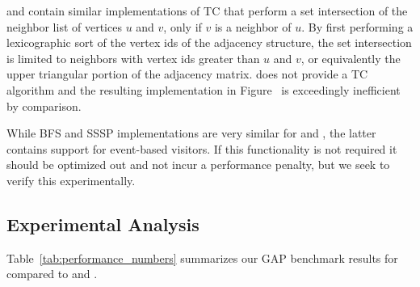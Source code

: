 \nwgraph and \stdgraph contain similar implementations of TC 
that perform a set intersection of the neighbor list of vertices
$u$ and $v$, only if $v$ is a neighbor of $u$.
By first performing a lexicographic sort of the vertex ids of the adjacency
structure, the set intersection is limited to neighbors with vertex ids greater
than $u$ and $v$, or equivalently the upper triangular portion of the adjacency
matrix.  \bgl does not provide a TC algorithm and the resulting implementation in Figure~\cite{}
is exceedingly inefficient by comparison.

While BFS and SSSP implementations are very similar for \nwgraph and \stdgraph, the latter contains
support for event-based visitors.
If this functionality is not required it should be optimized out and not
incur a performance penalty,
but we seek to verify this experimentally.  


\subsection{Experimental Analysis}


Table~\ref{tab:performance_numbers} summarizes our GAP benchmark results for \stdgraph compared to \bgl and \nwgraph.

